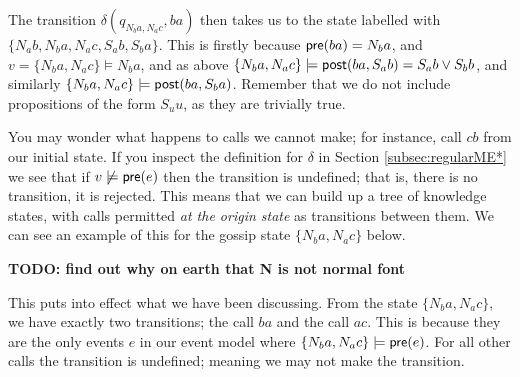 \documentclass[12pt, a4paper]{article} %
\begin{document}
The transition $\delta(q_{N_b a, N_a c}, ba)$ then takes us to the state labelled with $\{N_a b, N_b a, N_a c, S_a b, S_b a\}$. This is firstly because $\textsf{pre}(ba) = N_b a$, and $v = \{N_b a, N_a c\} \models N_b a$, and as above $\{N_b a, N_a c\} \models \textsf{post}(ba, S_a b) = S_a b \lor S_b b$, and similarly $\{N_b a, N_a c\} \models \textsf{post}(ba, S_b a)$. Remember that we do not include propositions of the form $S_u u$, as they are trivially true. 

\bigskip 

You may wonder what happens to calls we cannot make; for instance, call $cb$ from our initial state. If you inspect the definition for $\delta$ in Section \ref{subsec:regularME*} we see that if $v \not \models \textsf{pre} (e)$ then the transition is undefined; that is, there is no transition, it is rejected. This means that we can build up a tree of knowledge states, with calls permitted \textit{at the origin state} as transitions between them. We can see an example of this for the gossip state $\{N_b a, N_a c\}$ below. 

\begin{center}
\end{center}

\textbf{TODO: find out why on earth that N is not normal font}

This puts into effect what we have been discussing. From the state $\{N_b a, N_a c\}$, we have exactly two transitions; the call $ba$ and the call $ac$. This is because they are the only events $e$ in our event model  where $\{N_b a, N_a c\} \models \textsf{pre} (e)$. For all other calls the transition is undefined; meaning we may not make the transition. 
\end{document}
